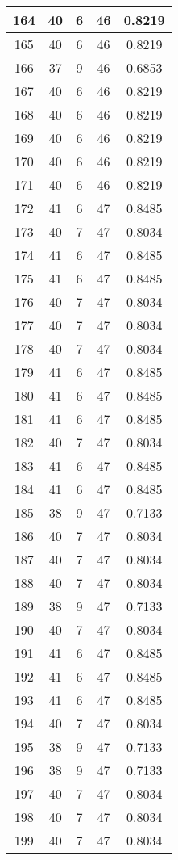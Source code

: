 \documentclass[letterpaper, 12pt]{article}
\begin{document}
\begin{longtable}{|c|c|c|c|c|}
\hline
164 & 40 & 6 & 46 & 0.8219 \\
\hline
165 & 40 & 6 & 46 & 0.8219 \\
\hline
166 & 37 & 9 & 46 & 0.6853 \\
\hline
167 & 40 & 6 & 46 & 0.8219 \\
\hline
168 & 40 & 6 & 46 & 0.8219 \\
\hline
169 & 40 & 6 & 46 & 0.8219 \\
\hline
170 & 40 & 6 & 46 & 0.8219 \\
\hline
171 & 40 & 6 & 46 & 0.8219 \\
\hline
172 & 41 & 6 & 47 & 0.8485 \\
\hline
173 & 40 & 7 & 47 & 0.8034 \\
\hline
174 & 41 & 6 & 47 & 0.8485 \\
\hline
175 & 41 & 6 & 47 & 0.8485 \\
\hline
176 & 40 & 7 & 47 & 0.8034 \\
\hline
177 & 40 & 7 & 47 & 0.8034 \\
\hline
178 & 40 & 7 & 47 & 0.8034 \\
\hline
179 & 41 & 6 & 47 & 0.8485 \\
\hline
180 & 41 & 6 & 47 & 0.8485 \\
\hline
181 & 41 & 6 & 47 & 0.8485 \\
\hline
182 & 40 & 7 & 47 & 0.8034 \\
\hline
183 & 41 & 6 & 47 & 0.8485 \\
\hline
184 & 41 & 6 & 47 & 0.8485 \\
\hline
185 & 38 & 9 & 47 & 0.7133 \\
\hline
186 & 40 & 7 & 47 & 0.8034 \\
\hline
187 & 40 & 7 & 47 & 0.8034 \\
\hline
188 & 40 & 7 & 47 & 0.8034 \\
\hline
189 & 38 & 9 & 47 & 0.7133 \\
\hline
190 & 40 & 7 & 47 & 0.8034 \\
\hline
191 & 41 & 6 & 47 & 0.8485 \\
\hline
192 & 41 & 6 & 47 & 0.8485 \\
\hline
193 & 41 & 6 & 47 & 0.8485 \\
\hline
194 & 40 & 7 & 47 & 0.8034 \\
\hline
195 & 38 & 9 & 47 & 0.7133 \\
\hline
196 & 38 & 9 & 47 & 0.7133 \\
\hline
197 & 40 & 7 & 47 & 0.8034 \\
\hline
198 & 40 & 7 & 47 & 0.8034 \\
\hline
199 & 40 & 7 & 47 & 0.8034 \\
\hline
\end{longtable}
\end{document}
